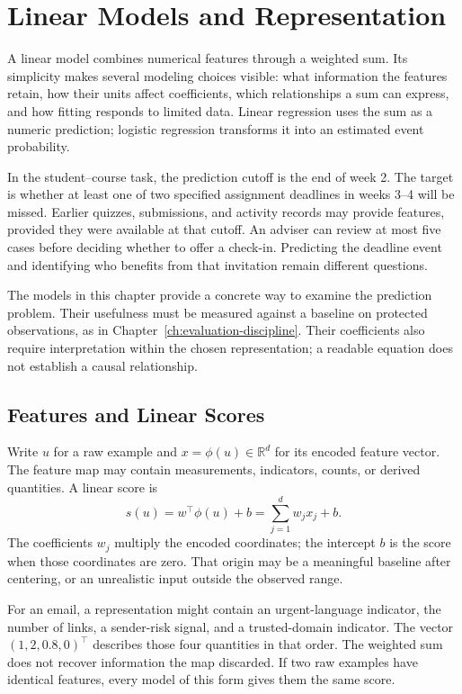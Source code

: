 \begingroup
\raggedbottom
{}
\chapter{Linear Models and Representation}
\label{ch:linear-models}

A linear model combines numerical features through a weighted sum. Its simplicity makes several modeling choices visible: what information the features retain, how their units affect coefficients, which relationships a sum can express, and how fitting responds to limited data. Linear regression uses the sum as a numeric prediction; logistic regression transforms it into an estimated event probability.

In the student--course task, the prediction cutoff is the end of week 2. The target is whether at least one of two specified assignment deadlines in weeks 3--4 will be missed. Earlier quizzes, submissions, and activity records may provide features, provided they were available at that cutoff. An adviser can review at most five cases before deciding whether to offer a check-in. Predicting the deadline event and identifying who benefits from that invitation remain different questions.

The models in this chapter provide a concrete way to examine the prediction problem. Their usefulness must be measured against a baseline on protected observations, as in Chapter~\ref{ch:evaluation-discipline}. Their coefficients also require interpretation within the chosen representation; a readable equation does not establish a causal relationship.

\section{Features and Linear Scores}

Write $u$ for a raw example and $x=\phi(u)\in\mathbb R^d$ for its encoded feature vector. The feature map may contain measurements, indicators, counts, or derived quantities. A linear score is
\[
s(u)=w^\top\phi(u)+b=\sum_{j=1}^d w_jx_j+b.
\]
The coefficients $w_j$ multiply the encoded coordinates; the intercept $b$ is the score when those coordinates are zero. That origin may be a meaningful baseline after centering, or an unrealistic input outside the observed range.

For an email, a representation might contain an urgent-language indicator, the number of links, a sender-risk signal, and a trusted-domain indicator. The vector $(1,2,0.8,0)^\top$ describes those four quantities in that order. The weighted sum does not recover information the map discarded. If two raw examples have identical features, every model of this form gives them the same score.

